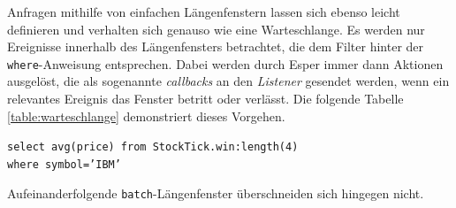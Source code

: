 \documentclass{acm_proc_article-sp}
\begin{document}
Anfragen mithilfe von einfachen Längenfenstern lassen sich ebenso leicht definieren und 
verhalten sich genauso wie eine Warteschlange. Es werden nur Ereignisse innerhalb des 
Längenfensters betrachtet, die dem Filter hinter der \texttt{where}-Anweisung 
entsprechen. Dabei werden durch Esper immer dann Aktionen ausgelöst, die als sogenannte 
\textit{callbacks} an den \textit{Listener} gesendet werden, wenn ein relevantes Ereignis 
das Fenster betritt oder verlässt. Die folgende Tabelle \ref{table:warteschlange} 
demonstriert dieses Vorgehen.

\texttt{select avg(price) from StockTick.win:length(4)\\where symbol='IBM'}

\begin{table}[ht]
    \caption{Längenfenster}
    \label{table:warteschlange}\vspace{0.2cm}
\end{table}

Aufeinanderfolgende \texttt{batch}-Längenfenster überschneiden sich hingegen nicht.
\end{document}

